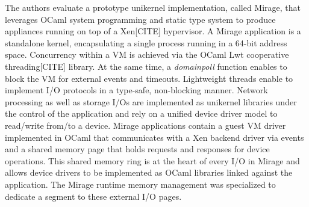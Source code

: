 %
%
%
The authors evaluate a prototype unikernel implementation, called Mirage, that leverages OCaml system programming and static type system to produce appliances running on top of a Xen[CITE] hypervisor.
A Mirage application is a standalone kernel, encapsulating a single process running in a 64-bit address space.
Concurrency within a VM is achieved via the OCaml Lwt cooperative threading[CITE] library.
At the same time, a \emph{domainpoll} function enables to block the VM for external events and timeouts.
Lightweight threads enable to implement I/O protocols in a type-safe, non-blocking manner.
Network processing as well as storage I/Os are implemented as unikernel libraries under the control of the application and rely on a unified device driver model to read/write from/to a device.
Mirage applications contain a guest VM driver implemented in OCaml that communicates with a Xen backend driver via events and a shared memory page that holds requests and responses for device operations.
This shared memory ring is at the heart of every I/O in Mirage and allows device drivers to be implemented as OCaml libraries linked against the application.
The Mirage runtime memory management was specialized to dedicate a segment to these external I/O pages.


